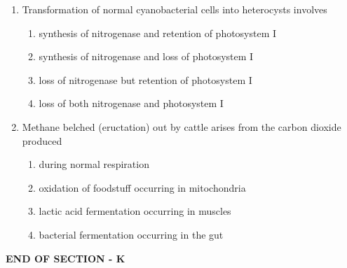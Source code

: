 \documentclass[journal,12pt,onecolumn]{IEEEtran}
\begin{document}
\begin{enumerate}[label=\arabic*.]
\item Transformation of normal cyanobacterial cells into heterocysts involves
\begin{enumerate}[label=(\Alph*)]
\item synthesis of nitrogenase and retention of photosystem I
\item synthesis of nitrogenase and loss of photosystem I
\item loss of nitrogenase but retention of photosystem I
\item loss of both nitrogenase and photosystem I
\end{enumerate}

\item Methane belched (eructation) out by cattle arises from the carbon dioxide produced
\begin{enumerate}[label=(\Alph*)]
\item during normal respiration
\item oxidation of foodstuff occurring in mitochondria
\item lactic acid fermentation occurring in muscles
\item bacterial fermentation occurring in the gut
\end{enumerate}

\end{enumerate}
\begin{center}
\textbf{END OF SECTION - K}
\end{center}
\newpage
\end{document}

